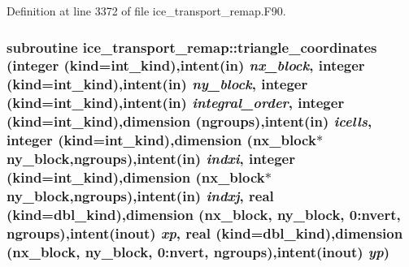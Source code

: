 Definition at line 3372 of file ice\_\-transport\_\-remap.F90.\hypertarget{namespaceice__transport__remap_a0118e9be4eed6545abe6b6d08ebea458}{
\subsubsection[{triangle\_\-coordinates}]{\setlength{\rightskip}{0pt plus 5cm}subroutine ice\_\-transport\_\-remap::triangle\_\-coordinates (integer (kind=int\_\-kind),intent(in) {\em nx\_\-block}, \/  integer (kind=int\_\-kind),intent(in) {\em ny\_\-block}, \/  integer (kind=int\_\-kind),intent(in) {\em integral\_\-order}, \/  integer (kind=int\_\-kind),dimension (ngroups),intent(in) {\em icells}, \/  integer (kind=int\_\-kind),dimension (nx\_\-block$\ast$ny\_\-block,ngroups),intent(in) {\em indxi}, \/  integer (kind=int\_\-kind),dimension (nx\_\-block$\ast$ny\_\-block,ngroups),intent(in) {\em indxj}, \/  real (kind=dbl\_\-kind),dimension (nx\_\-block, ny\_\-block, 0:nvert, ngroups),intent(inout) {\em xp}, \/  real (kind=dbl\_\-kind),dimension (nx\_\-block, ny\_\-block, 0:nvert, ngroups),intent(inout) {\em yp})}}
\label{namespaceice__transport__remap_a0118e9be4eed6545abe6b6d08ebea458}


